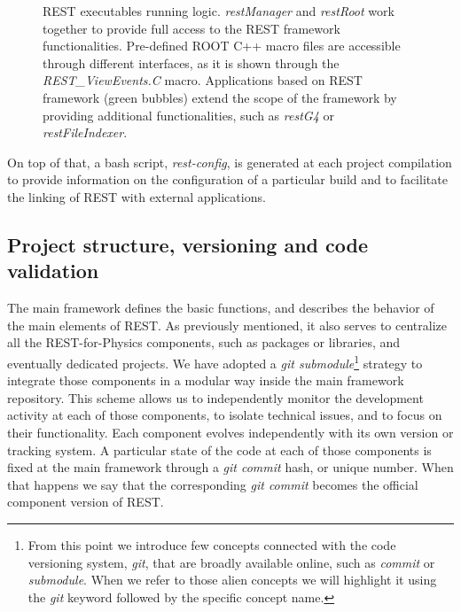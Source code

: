\begin{figure}[h]
  \centering
	\caption{REST executables running logic. \emph{restManager} and \emph{restRoot} work together to provide full access to the REST framework functionalities. Pre-defined ROOT C++ macro files are accessible through different interfaces, as it is shown through the \emph{REST\_ViewEvents.C} macro. Applications based on REST framework (green bubbles) extend the scope of the framework by providing additional functionalities, such as \emph{restG4} or \emph{restFileIndexer}.}
	\label{fig:executables}
\end{figure}

On top of that, a bash script, \emph{rest-config}, is generated at each project compilation to provide information on the configuration of a particular build and to facilitate the linking of REST with external applications. 

\subsection{Project structure, versioning and code validation}

The main framework defines the basic functions, and describes the behavior of the main elements of REST. As previously mentioned, it also serves to centralize all the REST-for-Physics components, such as packages or libraries, and eventually dedicated projects. We have adopted a \emph{git submodule}\footnote{From this point we introduce few concepts connected with the code versioning system, \emph{git}, that are broadly available online, such as \emph{commit} or \emph{submodule}. When we refer to those alien concepts we will highlight it using the \emph{git} keyword followed by the specific concept name.} strategy to integrate those components in a modular way inside the main framework repository. This scheme allows us to independently monitor the development activity at each of those components, to isolate technical issues, and to focus on their functionality. Each component evolves independently with its own version or tracking system. A particular state of the code at each of those components is fixed at the main framework through a \emph{git commit} hash, or unique number. When that happens we say that the corresponding \emph{git commit} becomes the official component version of REST.

